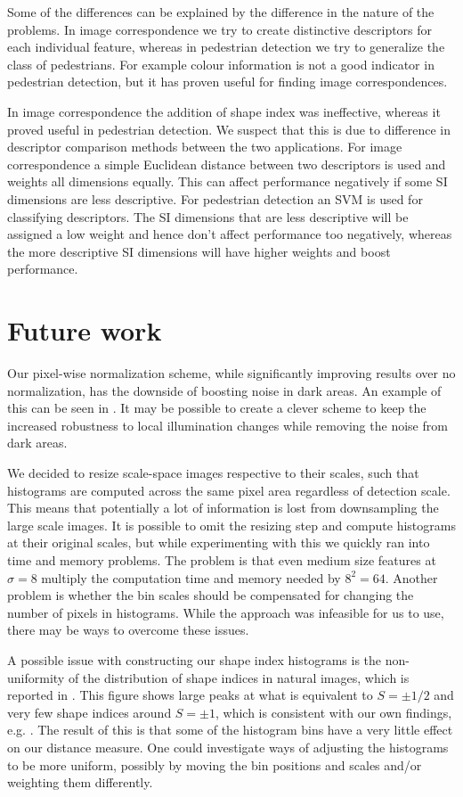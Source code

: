 \documentclass[thesis.tex]{subfiles}
\begin{document}
Some of the differences can be explained by the difference in the nature of the problems. In image correspondence we try to create distinctive descriptors for each individual feature, whereas in pedestrian detection we try to generalize the class of pedestrians. For example colour information is not a good indicator in pedestrian detection, but it has proven useful for finding image correspondences.

In image correspondence the addition of shape index was ineffective, whereas it proved useful in pedestrian detection. We suspect that this is due to difference in descriptor comparison methods between the two applications. For image correspondence a simple Euclidean distance between two descriptors is used and weights all dimensions equally. This can affect performance negatively if some SI dimensions are less descriptive. For pedestrian detection an SVM is used for classifying descriptors. The SI dimensions that are less descriptive will be assigned a low weight and hence don't affect performance too negatively, whereas the more descriptive SI dimensions will have higher weights and boost performance.

\section{Future work}
%
Our pixel-wise normalization scheme, while significantly improving results over no normalization, has the downside of boosting noise in dark areas. An example of this can be seen in . It may be possible to create a clever scheme to keep the increased robustness to local illumination changes while removing the noise from dark areas.

We decided to resize scale-space images respective to their scales, such that histograms are computed across the same pixel area regardless of detection scale. This means that potentially a lot of information is lost from downsampling the large scale images. It is possible to omit the resizing step and compute histograms at their original scales, but while experimenting with this we quickly ran into time and memory problems. The problem is that even medium size features at $\sigma = 8$ multiply the computation time and memory needed by $8^2 = 64$. Another problem is whether the bin scales should be compensated for changing the number of pixels in histograms. While the approach was infeasible for us to use, there may be ways to overcome these issues.

A possible issue with constructing our shape index histograms is the non-uniformity of the distribution of shape indices in natural images, which is reported in \citep[Fig. 3]{lillholm2009statistics}. This figure shows large peaks at what is equivalent to $S = \pm 1/2$ and very few shape indices around $S = \pm 1$, which is consistent with our own findings, e.g. . The result of this is that some of the histogram bins have a very little effect on our distance measure. One could investigate ways of adjusting the histograms to be more uniform, possibly by moving the bin positions and scales and/or weighting them differently.
\end{document}
